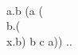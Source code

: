\documentclass{article}
\begin{document}
\LC \\a.b (a (\\b.(\\x.b) b c a))\; ..%
\bigskip

\end{document}
